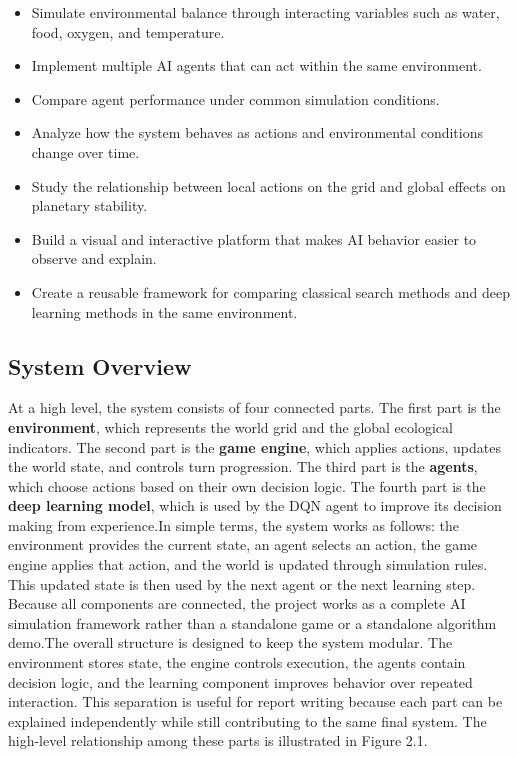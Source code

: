 \documentclass[12pt,a4paper]{article}
\begin{document}
\begin{itemize}[leftmargin=1.5cm]
    \item Simulate environmental balance through interacting variables such as water, food, oxygen, and temperature.
    \item Implement multiple AI agents that can act within the same environment.
    \item Compare agent performance under common simulation conditions.
    \item Analyze how the system behaves as actions and environmental conditions change over time.
    \item Study the relationship between local actions on the grid and global effects on planetary stability.
    \item Build a visual and interactive platform that makes AI behavior easier to observe and explain.
    \item Create a reusable framework for comparing classical search methods and deep learning methods in the same environment.
\end{itemize}

\subsection{System Overview}

At a high level, the system consists of four connected parts. The first part is the \textbf{environment}, which represents the world grid and the global ecological indicators. The second part is the \textbf{game engine}, which applies actions, updates the world state, and controls turn progression. The third part is the \textbf{agents}, which choose actions based on their own decision logic. The fourth part is the \textbf{deep learning model}, which is used by the DQN agent to improve its decision making from experience.In simple terms, the system works as follows: the environment provides the current state, an agent selects an action, the game engine applies that action, and the world is updated through simulation rules. This updated state is then used by the next agent or the next learning step. Because all components are connected, the project works as a complete AI simulation framework rather than a standalone game or a standalone algorithm demo.The overall structure is designed to keep the system modular. The environment stores state, the engine controls execution, the agents contain decision logic, and the learning component improves behavior over repeated interaction. This separation is useful for report writing because each part can be explained independently while still contributing to the same final system. The high-level relationship among these parts is illustrated in Figure 2.1.
\end{document}
